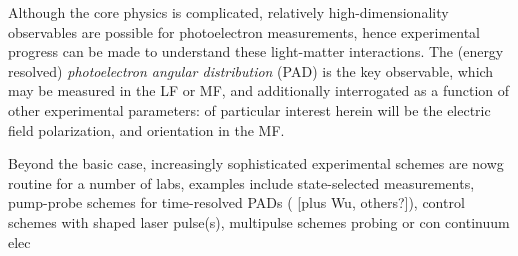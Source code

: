 Although the core physics is complicated, relatively high-dimensionality observables are possible for photoelectron measurements, hence experimental progress can be made to understand these light-matter interactions. The (energy resolved) \textit{photoelectron angular distribution} (PAD) is the key observable, which may be measured in the LF or MF, and additionally interrogated as a function of other experimental parameters: of particular interest herein will be the electric field polarization, and orientation in the MF. 

Beyond the basic case, increasingly sophisticated experimental schemes are nowg routine for a number of labs, examples include state-selected measurements, pump-probe schemes for time-resolved PADs (\cite{Seideman2002} [plus Wu, others?]), control schemes with shaped laser pulse(s), multipulse schemes probing or con continuum elec

